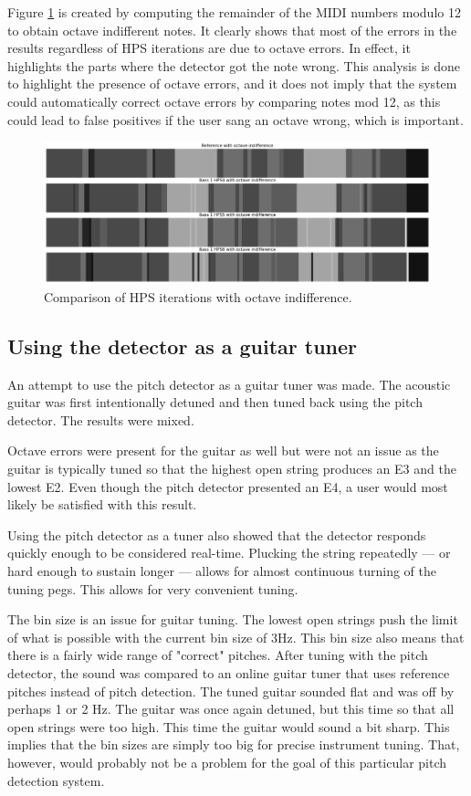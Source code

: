 Figure \ref{fig:hpsOctaveErrors} is created by computing the remainder of the MIDI numbers modulo 12 to obtain octave indifferent notes. It clearly shows that most of the errors in the results regardless of HPS iterations are due to octave errors. In effect, it highlights the parts where the detector got the note wrong. This analysis is done to highlight the presence of octave errors, and it does not imply that the system could automatically correct octave errors by comparing notes mod 12, as this could lead to false positives if the user sang an octave wrong, which is important.

\begin{figure}[ht]
    \centering
    \includegraphics[width=\textwidth]{./images/hpsOctaveErrors.png}
    \caption{Comparison of HPS iterations with octave indifference. \label{fig:hpsOctaveErrors}}
\end{figure}


\subsection{Using the detector as a guitar tuner}
An attempt to use the pitch detector as a guitar tuner was made. The acoustic guitar was first intentionally detuned and then tuned back using the pitch detector. The results were mixed.

Octave errors were present for the guitar as well but were not an issue as the guitar is typically tuned so that the highest open string produces an E3 and the lowest E2. Even though the pitch detector presented an E4, a user would most likely be satisfied with this result.

Using the pitch detector as a tuner also showed that the detector responds quickly enough to be considered real-time. Plucking the string repeatedly — or hard enough to sustain longer — allows for almost continuous turning of the tuning pegs. This allows for very convenient tuning.

The bin size is an issue for guitar tuning. The lowest open strings push the limit of what is possible with the current bin size of 3Hz. This bin size also means that there is a fairly wide range of "correct" pitches. After tuning with the pitch detector, the sound was compared to an online guitar tuner that uses reference pitches instead of pitch detection. The tuned guitar sounded flat and was off by perhaps 1 or 2 Hz. The guitar was once again detuned, but this time so that all open strings were too high. This time the guitar would sound a bit sharp. This implies that the bin sizes are simply too big for precise instrument tuning. That, however, would probably not be a problem for the goal of this particular pitch detection system. 

